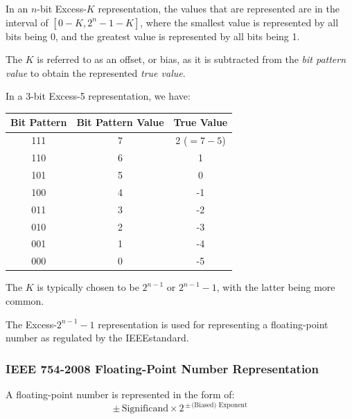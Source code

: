 \begin{definition}
    In an $n$-bit Excess-$K$ representation, the values that are represented are in the interval of
    $[0 - K, 2^n - 1 - K]$, where the smallest value is represented by all bits being 0, and the
    greatest value is represented by all bits being 1.

    The $K$ is referred to as an offset, or bias, as it is subtracted from the \textit{bit pattern value} to
    obtain the represented \textit{true value}.

    \begin{example}
        In a 3-bit Excess-5 representation, we have:

        \centering
        \begin{tabular}{|c|c|c|}
            \hline
            Bit Pattern & Bit Pattern Value & True Value \\
            \hline
            111 & 7 & 2 ($=7-5$) \\
            110 & 6 & 1 \\
            101 & 5 & 0 \\
            100 & 4 & -1 \\
            011 & 3 & -2 \\
            010 & 2 & -3 \\
            001 & 1 & -4 \\
            000 & 0 & -5 \\
            \hline
        \end{tabular}
    \end{example}

    The $K$ is typically chosen to be $2^{n-1}$ or $2^{n-1} - 1$, with the latter being more common.

    The Excess-$2^{n-1} - 1$ representation is used for representing a floating-point number
    as regulated by the IEEE\footnotemark standard.
\end{definition}


\subsubsection{IEEE 754-2008 Floating-Point Number Representation}

\begin{definition}
    A floating-point number is represented in the form of:
    \[\pm\,\text{Significand}\times 2^{\,\pm\,\text{(Biased) Exponent}}\]
\end{definition}

